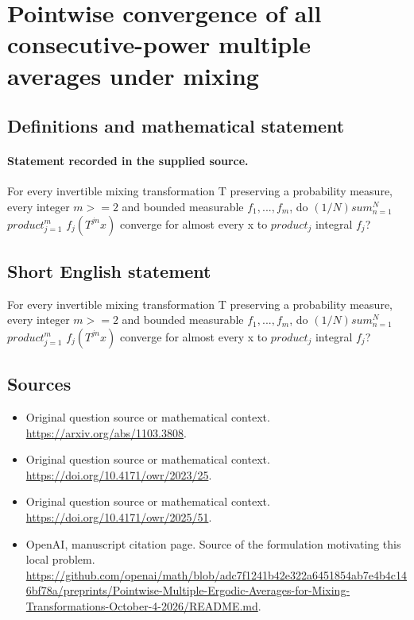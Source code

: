 \documentclass[11pt]{article}
\begin{document}
\section*{Pointwise convergence of all consecutive-power multiple averages under mixing}\label{30007165}
\subsection{Definitions and mathematical statement}
\paragraph{Statement recorded in the supplied source.}
For every invertible mixing transformation T preserving a probability measure, every integer $m>=2$ and bounded measurable $f_1,...,f_m$, do $(1/N)sum_{n=1}^N$ $product_{j=1}^m$ $f_j(T^{jn}x)$ converge for almost every x to $product_j$ integral $f_j$?
\subsection{Short English statement}
For every invertible mixing transformation T preserving a probability measure, every integer $m>=2$ and bounded measurable $f_1,...,f_m$, do $(1/N)sum_{n=1}^N$ $product_{j=1}^m$ $f_j(T^{jn}x)$ converge for almost every x to $product_j$ integral $f_j$?
\subsection{Sources}
\begin{itemize}
\item[S1] Original question source or mathematical context.
\url{https://arxiv.org/abs/1103.3808}.
\item[S2] Original question source or mathematical context.
\url{https://doi.org/10.4171/owr/2023/25}.
\item[S3] Original question source or mathematical context.
\url{https://doi.org/10.4171/owr/2025/51}.
\item[S4] OpenAI, manuscript citation page. Source of the formulation motivating this local problem.
\url{https://github.com/openai/math/blob/adc7f1241b42e322a6451854ab7e4b4c146bf78a/preprints/Pointwise-Multiple-Ergodic-Averages-for-Mixing-Transformations-October-4-2026/README.md}.
\end{itemize}
\end{document}
